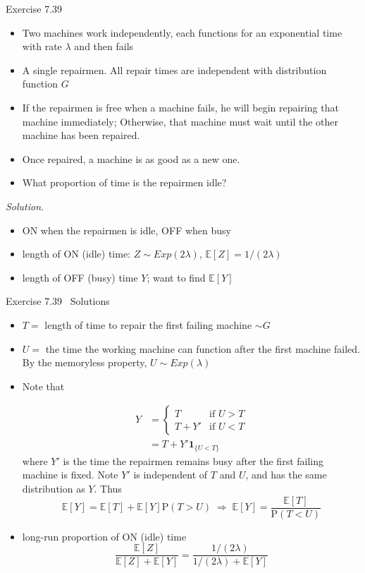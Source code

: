 \documentclass[letterpaper,handout, mathserif]{beamer}
\def\p{\mathrm P}
\def\E{\mathbb E}
\begin{document}
\begin{frame}{Exercise 7.39}
\begin{itemize}
\item Two machines work independently, each functions for an exponential
time with rate $\lambda$ and then fails
\item A single repairmen. All repair times are independent with
distribution function $G$
\item If the repairmen is free when a machine fails, he will begin
repairing that machine immediately; Otherwise, that
machine must wait until the other machine has been repaired.
\item Once repaired, a machine is as good as a new one.
\item What proportion of time is the repairmen idle?
\end{itemize}
{\em Solution.}
\begin{itemize}
\item ON when the repairmen is idle, OFF when busy
\item length of ON (idle)  time: $Z \sim Exp(2\lambda)$, $\E[Z] = 1/(2\lambda)$
\item length of OFF (busy) time $Y$; want to find $\E[Y]$
\end{itemize}
\end{frame}
\begin{frame}{Exercise 7.39~ Solutions}
\begin{itemize}
\item $T =$ length of time to repair the first failing machine $\sim G$
\item $U =$ the time the working machine can function after the first
machine failed. By the memoryless property, $U \sim Exp(\lambda)$
\item Note that

\vspace{-26pt}\begin{align*}
Y &=
\begin{cases}
T    & \text{if } U > T\\[-3pt]
T+Y' & \text{if } U < T
\end{cases}\\
&=T+Y'\mathbf{1}_{\{U<T\}}
\end{align*}
where $Y'$ is the time the repairmen remains busy after the
first failing machine is fixed. Note $Y'$ is independent of
$T$ and $U$, and has the same distribution as $Y$. Thus
$$
\E[Y] = \E[T] + \E[Y]\p(T > U)\;\Rightarrow\; \E[Y] = \frac{\E[T]}{\p(T < U)}
$$
\item long-run proportion of ON (idle) time $$\dfrac{\E[Z]}{\E[Z] + \E[Y]}
=\dfrac{1/(2\lambda)}{1/(2\lambda) + \E[Y]}$$
\end{itemize}
\end{frame}
\end{document}

